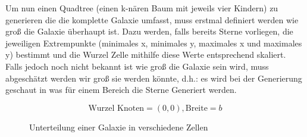 Um nun einen Quadtree (einen k-nären Baum mit jeweils vier Kindern) zu
generieren die die komplette Galaxie umfasst, muss erstmal definiert werden wie
groß die Galaxie überhaupt ist. Dazu werden, falls bereits Sterne vorliegen,
die jeweiligen Extrempunkte (minimales x, minimales y, maximales x und
maximales y) bestimmt und die Wurzel Zelle mithilfe diese Werte entsprechend
skaliert.  Falls jedoch noch nicht bekannt ist wie groß die Galaxie sein wird,
muss abgeschätzt werden wir groß sie werden könnte, d.h.: es wird bei der
Generierung geschaut in was für einem Bereich die Sterne Generiert werden. 

\begin{equation}
    \text{Wurzel Knoten} = (0, 0), \text{Breite}=b
\end{equation}

\bigskip

\begin{figure}
\hspace{1.5cm}
\begin{minipage}{0.45\textwidth}
\end{minipage}
\caption{Unterteilung einer Galaxie in verschiedene Zellen}
\label{fig:cells}
\end{figure}

